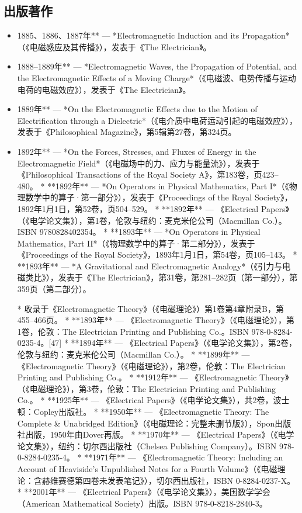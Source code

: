 \subsection{出版著作}
\begin{itemize}
\item 1885、1886、1887年** — *Electromagnetic Induction and its Propagation*（《电磁感应及其传播》），发表于《The Electrician》。
\item 1888–1889年** — *Electromagnetic Waves, the Propagation of Potential, and the Electromagnetic Effects of a Moving Charge*（《电磁波、电势传播与运动电荷的电磁效应》），发表于《The Electrician》。
\item 1889年** — *On the Electromagnetic Effects due to the Motion of Electrification through a Dielectric*（《电介质中电荷运动引起的电磁效应》），发表于《Philosophical Magazine》，第5辑第27卷，第324页。
\item 1892年** — *On the Forces, Stresses, and Fluxes of Energy in the Electromagnetic Field*（《电磁场中的力、应力与能量流》），发表于《Philosophical Transactions of the Royal Society A》，第183卷，页423–480。
* **1892年** — *On Operators in Physical Mathematics, Part I*（《物理数学中的算子·第一部分》），发表于《Proceedings of the Royal Society》，1892年1月1日，第52卷，页504–529。
* **1892年** — 《Electrical Papers》（《电学论文集》），第1卷，伦敦与纽约：麦克米伦公司（Macmillan Co.）。ISBN 9780828402354。
* **1893年** — *On Operators in Physical Mathematics, Part II*（《物理数学中的算子·第二部分》），发表于《Proceedings of the Royal Society》，1893年1月1日，第54卷，页105–143。
* **1893年** — *A Gravitational and Electromagnetic Analogy*（《引力与电磁类比》），发表于《The Electrician》，第31卷，第281–282页（第一部分），第359页（第二部分）。

  * 收录于《Electromagnetic Theory》（《电磁理论》）第1卷第4章附录B，第455–466页。
* **1893年** — 《Electromagnetic Theory》（《电磁理论》），第1卷，伦敦：The Electrician Printing and Publishing Co.。ISBN 978-0-8284-0235-4。[47]
* **1894年** — 《Electrical Papers》（《电学论文集》），第2卷，伦敦与纽约：麦克米伦公司（Macmillan Co.）。
* **1899年** — 《Electromagnetic Theory》（《电磁理论》），第2卷，伦敦：The Electrician Printing and Publishing Co.。
* **1912年** — 《Electromagnetic Theory》（《电磁理论》），第3卷，伦敦：The Electrician Printing and Publishing Co.。
* **1925年** — 《Electrical Papers》（《电学论文集》），共2卷，波士顿：Copley出版社。
* **1950年** — 《Electromagnetic Theory: The Complete & Unabridged Edition》（《电磁理论：完整未删节版》），Spon出版社出版，1950年由Dover再版。
* **1970年** — 《Electrical Papers》（《电学论文集》），纽约：切尔西出版社（Chelsea Publishing Company）。ISBN 978-0-8284-0235-4。
* **1971年** — 《Electromagnetic Theory: Including an Account of Heaviside's Unpublished Notes for a Fourth Volume》（《电磁理论：含赫维赛德第四卷未发表笔记》），切尔西出版社，ISBN 0-8284-0237-X。
* **2001年** — 《Electrical Papers》（《电学论文集》），美国数学学会（American Mathematical Society）出版。ISBN 978-0-8218-2840-3。

\end{itemize}